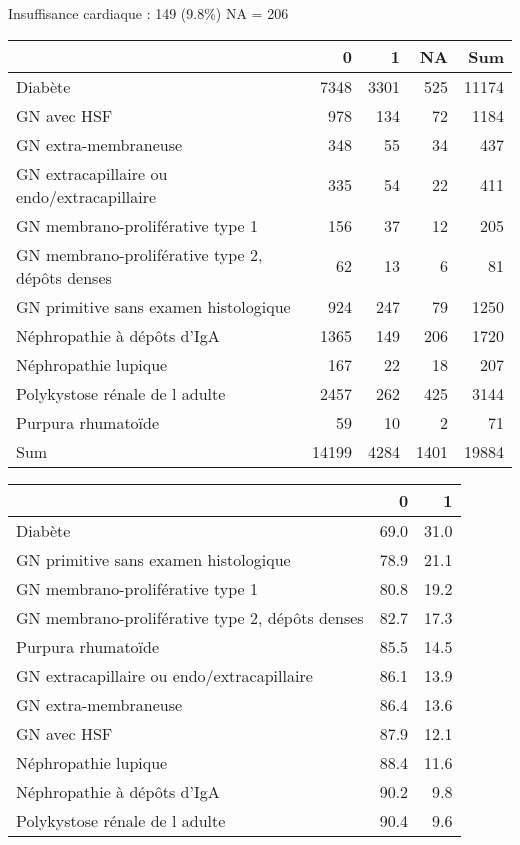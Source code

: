 \documentclass[11pt,a4paper]{article}\usepackage[]{graphicx}\usepackage[]{color}
\begin{document}
Insuffisance cardiaque : 149 (9.8\%) NA = 206

\begin{table}[H]
\centering
\begin{tabular}{lrrrr}
  \hline
 & 0 & 1 & NA & Sum \\ 
  \hline
Diabète & 7348 & 3301 & 525 & 11174 \\ 
  GN avec HSF & 978 & 134 & 72 & 1184 \\ 
  GN extra-membraneuse & 348 & 55 & 34 & 437 \\ 
  GN extracapillaire ou endo/extracapillaire & 335 & 54 & 22 & 411 \\ 
  GN membrano-proliférative type 1 & 156 & 37 & 12 & 205 \\ 
  GN membrano-proliférative type 2, dépôts denses & 62 & 13 & 6 & 81 \\ 
  GN primitive sans examen histologique & 924 & 247 & 79 & 1250 \\ 
  Néphropathie à dépôts d'IgA & 1365 & 149 & 206 & 1720 \\ 
  Néphropathie lupique & 167 & 22 & 18 & 207 \\ 
  Polykystose rénale de l adulte & 2457 & 262 & 425 & 3144 \\ 
  Purpura rhumatoïde & 59 & 10 & 2 & 71 \\ 
  Sum & 14199 & 4284 & 1401 & 19884 \\ 
   \hline
\end{tabular}
\end{table}
\begin{table}[H]
\centering
\begin{tabular}{lrr}
  \hline
 & 0 & 1 \\ 
  \hline
Diabète & 69.0 & 31.0 \\ 
  GN primitive sans examen histologique & 78.9 & 21.1 \\ 
  GN membrano-proliférative type 1 & 80.8 & 19.2 \\ 
  GN membrano-proliférative type 2, dépôts denses & 82.7 & 17.3 \\ 
  Purpura rhumatoïde & 85.5 & 14.5 \\ 
  GN extracapillaire ou endo/extracapillaire & 86.1 & 13.9 \\ 
  GN extra-membraneuse & 86.4 & 13.6 \\ 
  GN avec HSF & 87.9 & 12.1 \\ 
  Néphropathie lupique & 88.4 & 11.6 \\ 
  Néphropathie à dépôts d'IgA & 90.2 & 9.8 \\ 
  Polykystose rénale de l adulte & 90.4 & 9.6 \\ 
   \hline
\end{tabular}
\end{table}
\end{document}
